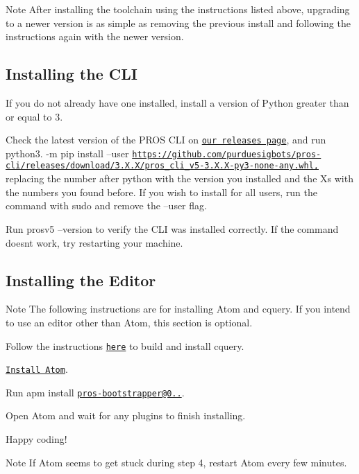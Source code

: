 \begin{DoxyNote}{Note}
After installing the toolchain using the instructions listed above, upgrading to a newer version is as simple as removing the previous install and following the instructions again with the newer version.
\end{DoxyNote}
\subsection*{Installing the C\+LI}


\begin{DoxyEnumerate}
\item If you do not already have one installed, install a version of Python greater than or equal to 3.
\item Check the latest version of the P\+R\+OS C\+LI on \href{https://github.com/purduesigbots/pros-cli3/releases/latest}{\tt our releases page}, and run python3. -\/m pip install --user \href{https://github.com/purduesigbots/pros-cli/releases/download/3.X.X/pros_cli_v5-3.X.X-py3-none-any.whl,}{\tt https\+://github.\+com/purduesigbots/pros-\/cli/releases/download/3.\+X.\+X/pros\+\_\+cli\+\_\+v5-\/3.\+X.\+X-\/py3-\/none-\/any.\+whl,} replacing the number after \textquotesingle{}python\textquotesingle{} with the version you installed and the Xs with the numbers you found before. If you wish to install for all users, run the command with sudo and remove the --user flag.
\item Run prosv5 --version to verify the C\+LI was installed correctly. If the command doesn\textquotesingle{}t work, try restarting your machine.
\end{DoxyEnumerate}

\subsection*{Installing the Editor}

\begin{DoxyNote}{Note}
The following instructions are for installing Atom and cquery. If you intend to use an editor other than Atom, this section is optional.
\end{DoxyNote}

\begin{DoxyEnumerate}
\item Follow the instructions \href{https://github.com/cquery-project/cquery/wiki/Building-cquery}{\tt here} to build and install cquery.
\item \href{https://atom.io}{\tt Install Atom}.
\item Run apm install \href{mailto:pros-bootstrapper@0.0.12}{\tt pros-\/bootstrapper@0..}.
\item Open Atom and wait for any plugins to finish installing.
\item Happy coding!
\end{DoxyEnumerate}

\begin{DoxyNote}{Note}
If Atom seems to get stuck during step 4, restart Atom every few minutes. 
\end{DoxyNote}

